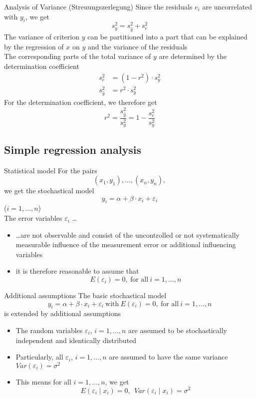 \documentclass{beamer}
\begin{document}
\begin{frame}{Analysis of Variance (Streuungszerlegung)}
Since the residuals $e_i$ are uncorrelated with $y_i$, we get
\[
  s_y^2 = s_{\hat{y}}^2 + s_e^2
\]
The variance of criterion $y$ can be partitioned into a part that can be
  explained by the regression of $x$ on $y$ and the variance of the
  residuals\\[2ex]

  The corresponding parts of the total variance of $y$ are determined by
  the determination coefficient
\begin{align*}
  s_e^2 &= (1 - r^2) \cdot s_y^2\\
  s_{\hat{y}}^2 &= r^2 \cdot s_y^2
\end{align*}
For the determination coefficient, we therefore get
\[
  r^2 = \frac{s_{\hat{y}}^2}{s_y^2} = 1 - \frac{s_e^2}{s_y^2}
\]
\end{frame}

\subsection{Simple regression analysis}

\begin{frame}{Statistical model}
For the pairs
\[
  (x_1, y_1), \ldots, (x_n, y_n),
\]
we get the stochastical model
\[
  y_i = \alpha + \beta \cdot x_i + \varepsilon_i
\]
($i = 1, \ldots, n$)\\[2ex]

The error variables $\varepsilon_i$ \ldots
\begin{itemize}
\item \ldots are not observable and consist of the uncontrolled or not
  systematically measurable influence of the measurement error or
  additional influencing variables
\item it is therefore reasonable to assume that
\[
  E(\varepsilon_i) = 0, ~\text{for all}~ i = 1, \ldots, n
\]
\end{itemize}
\end{frame}

\begin{frame}{Additional assumptions}
The basic stochastical model
\[
  y_i = \alpha + \beta \cdot x_i + \varepsilon_i ~\text{with}~
  E(\varepsilon_i) = 0, ~\text{for all}~ i = 1, \ldots, n
\]
is extended by additional assumptions

\begin{itemize}
\item The random variables $\varepsilon_i$, $i = 1, \ldots, n$ are assumed
  to be stochastically independent and identically distributed

\item Particularly, all $\varepsilon_i$, $i = 1, \ldots, n$ are assumed
  to have the same variance $Var(\varepsilon_i) = \sigma^2$

\item This means for all $i = 1, \ldots, n$, we get
\[
  E(\varepsilon_i \mid x_i) = 0, ~~
  Var(\varepsilon_i \mid x_i) = \sigma^2
\]
\end{itemize}
\end{frame}
\end{document}
